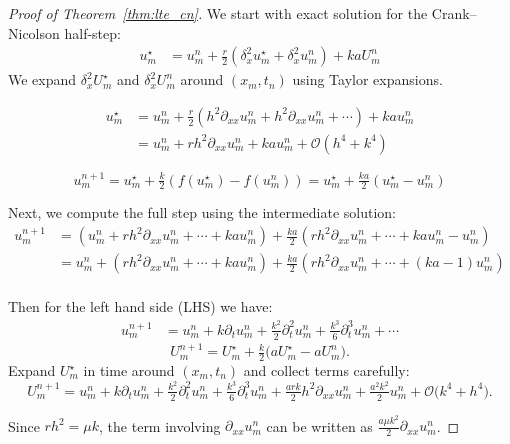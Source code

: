 \begin{proof}[Proof of Theorem~\ref{thm:lte_cn}]
  We start with exact solution for the Crank--Nicolson half-step:
  \begin{align*}
    u_m^\star
    &= u_m^n
    + \frac{r}{2}\left(\delta_x^2 u_m^\star + \delta_x^2 u_m^n\right)
    + kaU_m^n 
  \end{align*}
  We expand \(\delta_x^2 U_m^\star\) and \(\delta_x^2 U_m^n\) around $(x_m,t_n)$ using Taylor expansions.
  
  \begin{align*}
    u_m^\star &= u_m^n 
    + \tfrac{r}{2}\left(h^2\partial_{xx}u_m^n + h^2\partial_{xx}u_m^n + \cdots \right) 
    + ka u_m^n \\
    &= u_m^n
    + rh^2\partial_{xx}u_m^n + ka u_m^n
    + \mathcal{O}(h^4 + k^4)
  \end{align*}

  \[
    u_m^{n+1} = u_m^\star + \tfrac{k}{2}\left(f(u_m^\star) - f(u_m^n)\right) = u_m^\star + \tfrac{ka}{2}\left(u_m^\star - u_m^n\right)
  \]

  Next, we compute the full step using the intermediate solution:
  \begin{align*}
    u_m^{n+1} &=
    \left(u_m^n
    + rh^2\partial_{xx}u_m^n + \cdots + ka u_m^n \right)
    + \tfrac{ka}{2}\left(rh^2\partial_{xx}u_m^n + \cdots + ka u_m^n - u_m^n \right) \\
    &=
    u_m^n
    + \left(rh^2\partial_{xx}u_m^n + \cdots + ka u_m^n\right)
    + \tfrac{ka}{2}\left(rh^2\partial_{xx}u_m^n + \cdots + (ka - 1)u_m^n \right) \\
  \end{align*}

  Then for the left hand side (LHS) we have:
  \begin{align*}
    u_m^{n+1} &=
    u_m^n
    + k\partial_t u_m^n
    + \tfrac{k^2}{2}\partial_t^2 u_m^n
    + \tfrac{k^3}{6}\partial_t^3 u_m^n
    + \cdots
  \end{align*}
  \[
    U_m^{n+1}
    = U_m^\star
    + \tfrac{k}{2}\bigl(aU_m^\star - aU_m^n\bigr).
  \]
  Expand $U_m^\star$ in time around $(x_m,t_n)$ and collect terms carefully:
  \[
    U_m^{n+1}
    = u_m^n
    + k\partial_t u_m^n
    + \tfrac{k^2}{2}\partial_t^2 u_m^n
    + \tfrac{k^3}{6}\partial_t^3 u_m^n
    + \tfrac{ark}{2}h^2\partial_{xx} u_m^n
    + \tfrac{a^2k^2}{2}u_m^n
    + \mathcal{O}\bigl(k^4 + h^4\bigr).
  \]

  Since $rh^2 = \mu k$, the term involving $\partial_{xx} u_m^n$ can be written as
  $\tfrac{a\mu k^2}{2}\partial_{xx}u_m^n$.


\end{proof}
